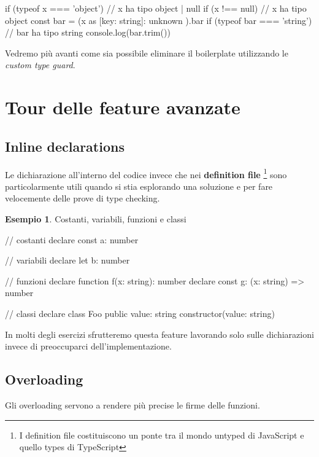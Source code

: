 \documentclass[12pt]{article}
\theoremstyle{definition}
\newtheorem{example}{Esempio}[subsection]
\newenvironment{code}
  {\vspace{0.5cm} \VerbatimEnvironment\begin{typescriptcode}}
  {\end{typescriptcode} \vspace{0.2cm}}
\begin{document}
\begin{code}
if (typeof x === 'object') {
  // x ha tipo object | null
  if (x !== null) {
    // x ha tipo object
    const bar = (x as { [key: string]: unknown }).bar
    if (typeof bar === 'string') {
      // bar ha tipo string
      console.log(bar.trim())
    }
  }
}
\end{code}

Vedremo più avanti come sia possibile eliminare il boilerplate utilizzando le \emph{custom type guard}.

\newpage

\section{Tour delle feature avanzate}

\subsection{Inline declarations}

Le dichiarazione all'interno del codice invece che nei \textbf{definition file}
\footnote{I definition file costituiscono un ponte tra il mondo untyped di JavaScript e quello types di TypeScript}
sono particolarmente utili quando si stia esplorando
una soluzione e per fare velocemente delle prove di type checking.

\begin{example}
Costanti, variabili, funzioni e classi

\begin{code}
// costanti
declare const a: number

// variabili
declare let b: number

// funzioni
declare function f(x: string): number
declare const g: (x: string) => number

// classi
declare class Foo {
  public value: string
  constructor(value: string)
}
\end{code}
\end{example}

In molti degli esercizi sfrutteremo questa feature lavorando solo sulle dichiarazioni invece di preoccuparci dell'implementazione.

\subsection{Overloading}

Gli overloading servono a rendere più precise le firme delle funzioni.
\end{document}
